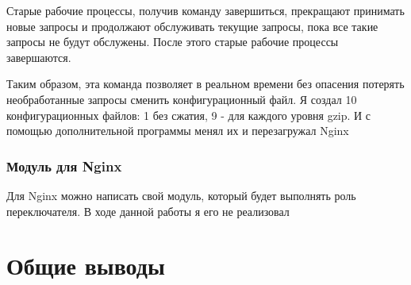 \documentclass[12pt]{article}
\begin{document}
Старые рабочие процессы, получив команду завершиться, прекращают принимать новые запросы и продолжают обслуживать текущие запросы, пока все такие запросы не будут обслужены. После этого старые рабочие процессы завершаются.

Таким образом, эта команда позволяет в реальном времени без опасения потерять необработанные запросы сменить конфигурационный файл. Я создал 10 конфигурационных файлов: 1 без сжатия, 9 - для каждого уровня gzip. И с помощью дополнительной
программы менял их и перезагружал Nginx

\subsubsection{Модуль для Nginx}

Для Nginx можно написать свой модуль, который будет выполнять роль переключателя. В ходе данной работы я его не реализовал

\section{Общие выводы}
\end{document}
